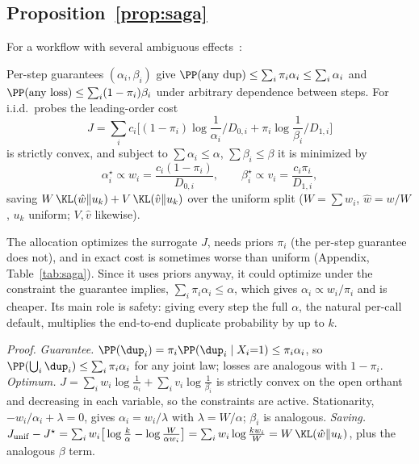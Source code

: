 \subsection{Proposition~\ref{prop:saga}}
For a workflow with several ambiguous effects~\cite{garciamolina1987sagas,chang2025sagallm}:
\begin{proposition}
\label{prop:saga}
Per-step guarantees $(\alpha_i,\beta_i)$ give $\PP(\text{any dup})\le\sum_i\pi_i\alpha_i\le\sum_i\alpha_i$ and $\PP(\text{any loss})\le\sum_i(1-\pi_i)\beta_i$ under arbitrary dependence
between steps. For i.i.d.\ probes the leading-order cost
\[
J=\textstyle\sum_i c_i\big[(1-\pi_i)\log\frac{1}{\alpha_i}/D_{0,i}+\pi_i\log\frac{1}{\beta_i}/D_{1,i}\big]
\]
is strictly convex, and subject to $\sum\alpha_i\le\alpha$, $\sum\beta_i\le\beta$ it is minimized by
\begin{equation}
\alpha_i^\star\propto w_i=\frac{c_i(1-\pi_i)}{D_{0,i}},\qquad \beta_i^\star\propto v_i=\frac{c_i\pi_i}{D_{1,i}},
\label{eq:kkt}
\end{equation}
saving $W\,\KL(\hat w\|u_k)+V\,\KL(\hat v\|u_k)$ over the uniform split ($W=\sum w_i$, $\hat w=w/W$, $u_k$ uniform; $V,\hat v$ likewise).
\end{proposition}
The allocation optimizes the surrogate $J$, needs priors $\pi_i$ (the per-step guarantee does not), and in exact cost is sometimes worse than uniform (Appendix, Table~\ref{tab:saga}).
Since it uses priors anyway, it could optimize under the constraint the guarantee implies, $\sum_i\pi_i\alpha_i\le\alpha$, which gives $\alpha_i\propto w_i/\pi_i$ and is cheaper.
Its main role is safety: giving every step the full $\alpha$, the natural per-call default, multiplies the end-to-end duplicate probability by up to $k$.

\noindent\emph{Proof.}
\emph{Guarantee.} $\PP(\dup_i)=\pi_i\PP(\dup_i\mid X_i{=}1)\le\pi_i\alpha_i$, so $\PP(\bigcup_i\dup_i)\le\sum_i\pi_i\alpha_i$ for any joint law; losses are analogous with $1-\pi_i$.
\emph{Optimum.} $J=\sum_iw_i\log\frac1{\alpha_i}+\sum_iv_i\log\frac1{\beta_i}$ is strictly convex on the open orthant and decreasing in each variable, so the constraints are active.
Stationarity, $-w_i/\alpha_i+\lambda=0$, gives $\alpha_i=w_i/\lambda$ with $\lambda=W/\alpha$; $\beta_i$ is analogous.
\emph{Saving.} $J_{\mathrm{unif}}-J^\star=\sum_iw_i\big[\log\frac k\alpha-\log\frac{W}{\alpha w_i}\big]=\sum_iw_i\log\frac{kw_i}{W}=W\,\KL(\hat w\|u_k)$, plus the analogous $\beta$ term.

